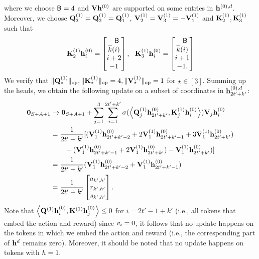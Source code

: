 where we choose ${\mathsf{B}}=4$ and ${\mathbf V}{\mathbf h}^{(0)}$ are supported on some entries in ${\mathbf h}^{(0),{d}}$. Moreover, we choose ${\mathbf Q}^{(1)}_{3}={\mathbf Q}^{(1)}_{2}={\mathbf Q}^{(1)}_1$, ${\mathbf V}^{(1)}_2={\mathbf V}^{(1)}_3=-{\mathbf V}^{(1)}_1$ and ${\mathbf K}^{(1)}_2,{\mathbf K}^{(1)}_3$ such that
\begin{align*}
    {\mathbf K}^{(1)}_{2}{\mathbf h}^{(0)}_{i}=\begin{bmatrix}
        -{\mathsf{B}}\\\overline{k}(i)\\ i+2\\-1
\end{bmatrix},~~{\mathbf K}^{(1)}_{3}{\mathbf h}^{(0)}_{i}=\begin{bmatrix}
        -{\mathsf{B}}\\\overline{k}(i)\\ i+1\\-1.
\end{bmatrix}
\end{align*}
We verify that $\|{{\mathbf Q}^{(1)}_{\star}}\|_{\mathrm{op}},\|{{\mathbf K}^{(1)}_{\star}}\|_{\mathrm{op}}= 4,\|{{\mathbf V}^{(1)}_{\star}}\|_{\mathrm{op}}=1$ for $\star\in[3]$.
Summing up the  heads, we obtain the following update on a subset of coordinates in ${\mathbf h}^{(0),{d}}_{2t'+k'}$:
\begin{align*}
{\mathbf 0}_{{S}+{A}+1}
    &\rightarrow
{\mathbf 0}_{{S}+{A}+1}+\sum_{j=1}^3\sum_{i=1}^{2t'+k'}\sigma(\left\langle{\mathbf Q}^{(1)}_{j}{\mathbf h}^{(0)}_{2t'+k'},{\mathbf K}^{(1)}_{j}{\mathbf h}^{(0)}_{i}\right\rangle){\mathbf V}_j{\mathbf h}^{(0)}_i\\
    &=\frac{1}{2t'+k'} [({\mathbf V}^{(1)}_1{\mathbf h}^{(0)}_{2t'+k'-2}+2{\mathbf V}^{(1)}_1{\mathbf h}^{(0)}_{2t'+k'-1}+3{\mathbf V}^{(1)}_1{\mathbf h}^{(0)}_{2t'+k'})\\
    &\qquad-({\mathbf V}^{(1)}_1{\mathbf h}^{(0)}_{2t'+k'-1}+2{\mathbf V}^{(1)}_1{\mathbf h}^{(0)}_{2t'+k'})-{\mathbf V}^{(1)}_1{\mathbf h}^{(0)}_{2t'+k'})]\\
    &=\frac{1}{2t'+k'}({\mathbf V}^{(1)}_1{\mathbf h}^{(0)}_{2t'+k'-2}+{\mathbf V}^{(1)}_1{\mathbf h}^{(0)}_{2t'+k'-1})\\
    &=\frac{1}{2t'+k'}\begin{bmatrix}
        {a}_{k',h'} \\{r}_{k',h'}\\{s}_{k',h'}
    \end{bmatrix}.
\end{align*}
Note that $\left\langle{\mathbf Q}^{(1)}{\mathbf h}^{(0)}_i,{\mathbf K}^{(1)}{\mathbf h}^{(0)}_j\right\rangle\leq0$ for $i=2t'-1+k'$ (i.e., all tokens that embed the action and reward) since ${v}_i=0$, it follows that no update happens on the tokens in which we embed the action and reward (i.e., the corresponding part of ${\mathbf h}^{d}$ remains zero). Moreover, it should be noted that no  update happens on tokens with $h=1$.

